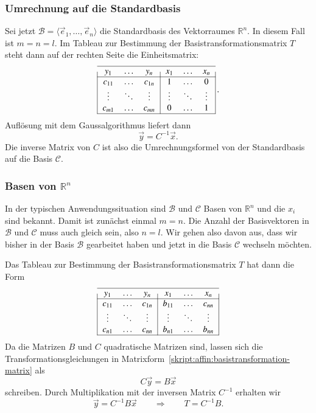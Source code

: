 \subsubsection{Umrechnung auf die Standardbasis}
Sei jetzt $\mathcal{B}=\langle\vec{e}_1,\dots,\vec{e}_n\rangle$ die
Standardbasis des Vektorraumes $\mathbb R^n$.
In diesem Fall ist $m=n=l$.
Im Tableau zur Bestimmung der Basistransformationsmatrix $T$ steht dann
auf der rechten Seite die Einheitsmatrix:
\begin{equation*}
\begin{tabular}{|>{$}c<{$}>{$}c<{$}>{$}c<{$}|>{$}c<{$}>{$}c<{$}>{$}c<{$}|}
\hline
   y_1&\dots &   y_n&   x_1&\dots &   x_n\\
\hline
c_{11}&\dots &c_{1n}&  1   &\dots &  0   \\
\vdots&\ddots&\vdots&\vdots&\ddots&\vdots\\
c_{m1}&\dots &c_{mn}&  0   &\dots &  1   \\
\hline
\end{tabular}\,.
\end{equation*}
Auflösung mit dem Gaussalgorithmus liefert dann
\[
\vec{y} = C^{-1} \vec{x}.
\]
Die inverse Matrix von $C$ ist also die Umrechnungsformel von der
Standardbasis auf die Basis $\mathcal{C}$.

\subsubsection{Basen von $\mathbb{R}^n$}
In der typischen Anwendungssituation sind $\mathcal{B}$ und $\mathcal{C}$
Basen von $\mathbb{R}^n$ und die $x_i$ sind bekannt.
Damit ist zunächst einmal $m=n$.
Die Anzahl der Basisvektoren in $\mathcal{B}$ und $\mathcal{C}$ muss
auch gleich sein, also $n=l$.
Wir gehen also davon aus, dass wir bisher in
der Basis $\mathcal{B}$ gearbeitet haben und jetzt in die Basis
$\mathcal{C}$ wechseln möchten.

Das Tableau zur Bestimmung der Basistransformationsmatrix $T$ hat dann die
Form
\begin{equation*}
\begin{tabular}{|>{$}c<{$}>{$}c<{$}>{$}c<{$}|>{$}c<{$}>{$}c<{$}>{$}c<{$}|}
\hline
   y_1&\dots &   y_n&   x_1&\dots &   x_n\\
\hline
c_{11}&\dots &c_{1n}&b_{11}&\dots &c_{nn}\\
\vdots&\ddots&\vdots&\vdots&\ddots&\vdots\\
c_{n1}&\dots &c_{nn}&b_{n1}&\dots &b_{nn}\\
\hline
\end{tabular}
\end{equation*}
Da die Matrizen $B$ und $C$ quadratische Matrizen sind, lassen sich die
Transformationsgleichungen in
Matrixform~\eqref{skript:affin:basistransformation-matrix}
als
\[
C\vec{y} = B\vec{x}
\]
schreiben.
Durch Multiplikation mit der inversen Matrix $C^{-1}$ erhalten wir
\begin{equation}
\vec{y} = C^{-1}B\vec{x}
\qquad\Rightarrow\qquad
T=C^{-1}B.
\label{skript:affin:basiswechselt}
\end{equation}

